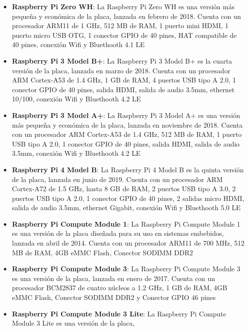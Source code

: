\begin{itemize}
        \item \textbf{Raspberry Pi Zero WH}: La Raspberry Pi Zero WH es una versi\'on m\'as peque\~na y econ\'omica 
            de la placa, lanzada en febrero de 2018. Cuenta con un procesador ARM11 de 1 GHz, 512 MB de RAM, 
            1 puerto mini HDMI, 1 puerto micro USB OTG, 1 conector GPIO de 40 pines, HAT compatible de 40 pines, 
            conexi\'on Wifi y Bluethooth 4.1 LE \cite{Santamaria2023}
        \item \textbf{Raspberry Pi 3 Model B+}: La Raspberry Pi 3 Model B+ es la cuarta versi\'on de la placa,
            lanzada en marzo de 2018. Cuenta con un procesador ARM Cortex-A53 de 1.4 GHz, 1 GB de RAM, 
            4 puertos USB tipo A 2.0, 1 conector GPIO de 40 pines, salida HDMI, salida de audio 3.5mm, ethernet 10/100, 
            conexi\'on Wifi y Bluethooth 4.2 LE \cite{Santamaria2023}
        \item \textbf{Raspberry Pi 3 Model A+}: La Raspberry Pi 3 Model A+ es una versi\'on m\'as peque\~na y 
            econ\'omica de la placa, lanzada en noviembre de 2018. Cuenta con un procesador ARM Cortex-A53 de 1.4 GHz, 
            512 MB de RAM, 1 puerto USB tipo A 2.0, 1 conector GPIO de 40 pines, salida HDMI, salida de audio 3.5mm, 
            conexi\'on Wifi y Bluethooth 4.2 LE \cite{Santamaria2023}
        \item \textbf{Raspberry Pi 4 Model B}: La Raspberry Pi 4 Model B es la quinta versi\'on de la placa,
            lanzada en junio de 2019. Cuenta con un procesador ARM Cortex-A72 de 1.5 GHz, hasta 8 GB de RAM, 
            2 puertos USB tipo A 3.0, 2 puertos USB tipo A 2.0, 1 conector GPIO de 40 pines, 2 salidas micro HDMI, 
            salida de audio 3.5mm, ethernet Gigabit, conexi\'on Wifi y Bluethooth 5.0 LE \cite{Santamaria2023}
        \item \textbf{Raspberry Pi Compute Module 1}: La Raspberry Pi Compute Module 1 es una versi\'on de la placa 
            dise\~nada para su uso en sistemas embebidos, lanzada en abril de 2014. Cuenta con un procesador ARM11 de 700 MHz, 
            512 MB de RAM, 4GB eMMC Flash, Conector SODIMM DDR2 \cite{Santamaria2023}
        \item \textbf{Raspberry Pi Compute Module 3}: La Raspberry Pi Compute Module 3 es una versi\'on de la placa, 
            lanzada en enero de 2017. Cuenta con un procesador BCM2837 de cuatro n\'ucleos a 1.2 GHz, 1 GB de RAM, 4GB eMMC Flash,
            Conector SODIMM DDR2 y Conector GPIO 46 pines \cite{Santamaria2023}
        \item \textbf{Raspberry Pi Compute Module 3 Lite}: La Raspberry Pi Compute Module 3 Lite es una versi\'on de la placa,

\end{itemize}
